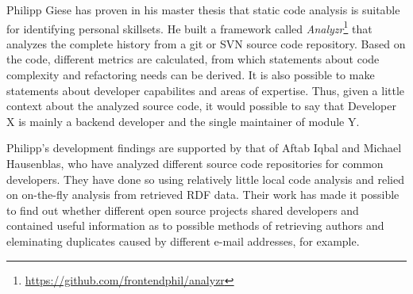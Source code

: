 Philipp Giese has proven in his master thesis\cite{pg:2014} that
static code analysis is suitable for identifying personal skillsets.
He built a framework called \textit{Analyzr}\footnote{\url{https://github.com/frontendphil/analyzr}}
that analyzes the complete history from a git or SVN source code repository.
Based on the code, different metrics are calculated, from which statements about
code complexity and refactoring needs can be derived. It is also possible
to make statements about developer capabilites and areas of expertise.
Thus, given a little context about the analyzed source code, it would possible
to say that \glqq Developer X is mainly a backend developer and the single maintainer of module Y\grqq.
\newline

Philipp's development findings are supported by that of
Aftab Iqbal and Michael Hausenblas, who have analyzed different
source code repositories for common developers\cite{ih:2012}.
They have done so using relatively little local code analysis and relied
on on-the-fly analysis from retrieved RDF data. Their work
has made it possible to find out whether different open source projects shared developers
and contained useful information as to possible methods of retrieving authors
and eleminating duplicates caused by different e-mail addresses, for example.